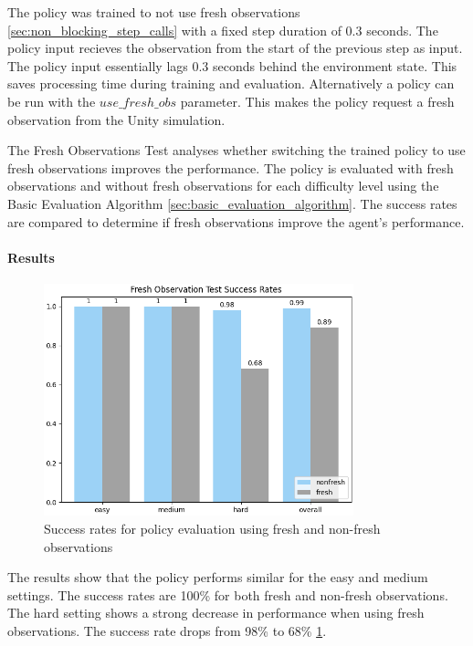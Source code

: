 The policy was trained to not use fresh observations \ref{sec:non_blocking_step_calls} with a fixed step duration of 0.3 seconds. The policy input recieves the observation from the start of the previous step as input. The policy input essentially lags 0.3 seconds behind the environment state. This saves processing time during training and evaluation. Alternatively a policy can be run with the $use\_fresh\_obs$ parameter. This makes the policy request a fresh observation from the Unity simulation.

The Fresh Observations Test analyses whether switching the trained policy to use fresh observations improves the performance. The policy is evaluated with fresh observations and without fresh observations for each difficulty level using the Basic Evaluation Algorithm \ref{sec:basic_evaluation_algorithm}. The success rates are compared to determine if fresh observations improve the agent's performance.

\paragraph{Results}

\begin{figure}
    \centering
    \includegraphics[width=0.8\textwidth]{Bilder/notebook_images/hardDistanceMixedLight_eval_freshNonFresh_success_rates_barplot.png}
    \caption{Success rates for policy evaluation using fresh and non-fresh observations}
    \label{fig:fresh_observations_test_result}
\end{figure}

The results show that the policy performs similar for the easy and medium settings. The success rates are 100\% for both fresh and non-fresh observations. The hard setting shows a strong decrease in performance when using fresh observations. The success rate drops from 98\% to 68\% \ref{fig:fresh_observations_test_result}.

